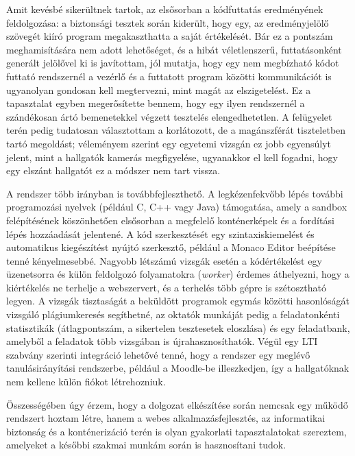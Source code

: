 Amit kevésbé sikerültnek tartok, az elsősorban a kódfuttatás eredményének feldolgozása: a
biztonsági tesztek során kiderült, hogy egy, az eredményjelölő szövegét kiíró program
megakaszthatta a saját értékelését. Bár ez a pontszám meghamisítására nem adott lehetőséget, és a
hibát véletlenszerű, futtatásonként generált jelölővel ki is javítottam, jól mutatja, hogy egy nem megbízható kódot futtató rendszernél a vezérlő és a
futtatott program közötti kommunikációt is ugyanolyan gondosan kell megtervezni, mint magát az
elszigetelést. Ez a tapasztalat egyben megerősítette bennem, hogy egy ilyen rendszernél a
szándékosan ártó bemenetekkel végzett tesztelés elengedhetetlen. A felügyelet terén pedig
tudatosan választottam a korlátozott, de a magánszférát tiszteletben tartó megoldást; véleményem
szerint egy egyetemi vizsgán ez jobb egyensúlyt jelent, mint a hallgatók kamerás megfigyelése,
ugyanakkor el kell fogadni, hogy egy elszánt hallgatót ez a módszer nem tart vissza.

A rendszer több irányban is továbbfejleszthető. A legkézenfekvőbb lépés további programozási
nyelvek (például C, C++ vagy Java) támogatása, amely a sandbox felépítésének köszönhetően
elsősorban a megfelelő konténerképek és a fordítási lépés hozzáadását jelentené. A kód
szerkesztését egy szintaxiskiemelést és automatikus kiegészítést nyújtó szerkesztő, például a
Monaco Editor beépítése tenné kényelmesebbé. Nagyobb létszámú vizsgák esetén a kódértékelést
egy üzenetsorra és külön feldolgozó folyamatokra (\textit{worker}) érdemes áthelyezni, hogy a
kiértékelés ne terhelje a webszervert, és a terhelés több gépre is szétosztható legyen. A
vizsgák tisztaságát a beküldött programok egymás közötti hasonlóságát vizsgáló plágiumkeresés
segíthetné, az oktatók munkáját pedig a feladatonkénti statisztikák (átlagpontszám, a sikertelen
tesztesetek eloszlása) és egy feladatbank, amelyből a feladatok több vizsgában is
újrahasznosíthatók. Végül egy LTI szabvány szerinti integráció lehetővé tenné, hogy a rendszer
egy meglévő tanulásirányítási rendszerbe, például a Moodle-be illeszkedjen, így a hallgatóknak nem
kellene külön fiókot létrehozniuk.

Összességében úgy érzem, hogy a dolgozat elkészítése során nemcsak egy működő rendszert hoztam
létre, hanem a webes alkalmazásfejlesztés, az informatikai biztonság és a konténerizáció terén
is olyan gyakorlati tapasztalatokat szereztem, amelyeket a későbbi szakmai munkám során is
hasznosítani tudok.
